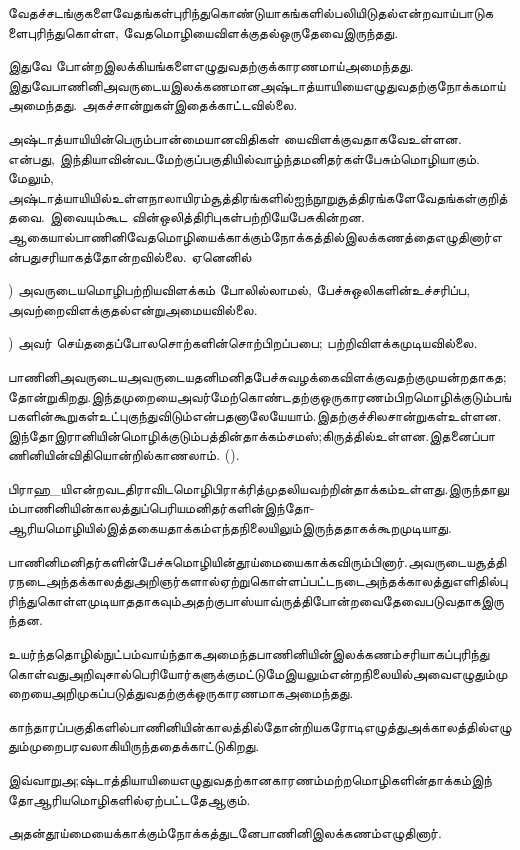வேதச்சடங்குகளைவேதங்கள்புரிந்துகொண்டுயாகங்களில்பலியிடுதல்என்றவாய்பாடுகளைபுரிந்துகொள்ள, வேதமொழியைவிளக்குதல்ஒருதேவைஇருந்தது. 

இதுவே  போன்றஇலக்கியங்களைஎழுதுவதற்குக்காரணமாய்அமைந்தது. இதுவேபாணினிஅவருடையஇலக்கணமானஅஷ்டாத்யாயியைஎழுதுவதற்குநோக்கமாய்அமைந்தது. அகச்சான்றுகள்இதைக்காட்டவில்லை. 

அஷ்டாத்யாயியின்பெரும்பான்மையானவிதிகள்  யைவிளக்குவதாகவேஉள்ளன.  என்பது, இந்தியாவின்வடமேற்குப்பகுதியில்வாழ்ந்தமனிதர்கள்பேசும்மொழியாகும். மேலும், அஷ்டாத்யாயியில்உள்ளநாலாயிரம்சூத்திரங்களில்ஐந்நூறுசூத்திரங்களேவேதங்கள்குறித்தவை. இவையும்கூட  வின்ஒலித்திரிபுகள்பற்றியேபேசுகின்றன. ஆகையால்பாணினிவேதமொழியைக்காக்கும்நோக்கத்தில்இலக்கணத்தைஎழுதினார்என்பதுசரியாகத்தோன்றவில்லை. ஏனெனில் 

) அவருடையமொழிபற்றியவிளக்கம்  போலில்லாமல், பேச்சுஒலிகளின்உச்சரிப்ப, அவற்றைவிளக்குதல்என்றுஅமையவில்லை. 

) அவர்  செய்ததைப்போலசொற்களின்சொற்பிறப்பபை; பற்றிவிளக்கமுடியவில்லை.

பாணினிஅவருடையஅவருடையதனிமனிதபேச்சுவழக்கைவிளக்குவதற்குமுயன்றதாகத;தோன்றுகிறது.இந்தமுறையைஅவர்மேற்கொண்டதற்குஒருகாரணம்பிறமொழிக்குடும்பங்பகளின்கூறுகள்உட்புகுந்துவிடும்என்பதனாலேயேயாம்.இதற்குச்சிலசான்றுகள்உள்ளன.இந்தோஇரானியின்மொழிக்குடும்பத்தின்தாக்கம்சமஸ்;கிருத்தில்உள்ளன.இதனைப்பாணினியின்விதியொன்றில்காணலாம். ().

 பிராஹ\_யிஎன்றவடதிராவிடமொழிபிராக்ரித்முதலியவற்றின்தாக்கம்உள்ளது.இருந்தாலும்பாணினியின்காலத்துப்பெரியமனிதர்களின்இந்தோ-ஆரியமொழியில்இத்தகையதாக்கம்எந்தநிலையிலும்இருந்ததாகக்கூறமுடியாது. 

பாணினிமனிதர்களின்பேச்சுமொழியின்தூய்மையைகாக்கவிரும்பினார்.அவருடையசூத்திரநடைஅந்தக்காலத்துஅறிஞர்களால்ஏற்றுகொள்ளப்பட்டநடைஅந்தக்காலத்துஎளிதில்புரிந்துகொள்ளமுடியாததாகவும்அதற்குபாஸ்யாவ்ருத்திபோன்றவைதேவைபடுவதாகஇருந்தன.

 உயர்ந்ததொழில்நுட்பம்வாய்ந்தாகஅமைந்தபாணினியின்இலக்கணம்சரியாகப்புரிந்துகொள்வதுஅறிவுசால்பெரியோர்களுக்குமட்டுமேஇயலும்என்றநிலையில்அவைஎழுதும்முறையைஅறிமுகப்படுத்துவதற்குக்ஒருகாரணமாகஅமைந்தது.

காந்தாரப்பகுதிகளில்பாணினியின்காலத்தில்தோன்றியகரோடிஎழுத்துஅக்காலத்தில்எழுதும்முறைபரவலாகியிருந்ததைக்காட்டுகிறது. 

இவ்வாறுஅ;ஷ்டாத்தியாயியைஎழுதுவதற்கானகாரணம்மற்றமொழிகளின்தாக்கம்இந்தோஆரியமொழிகளில்ஏற்பட்டதேஆகும்.

அதன்தூய்மையைக்காக்கும்நோக்கத்துடனேபாணினிஇலக்கணம்எழுதினார்.

